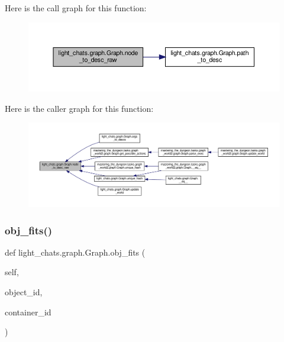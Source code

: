 Here is the call graph for this function\+:
\nopagebreak
\begin{figure}[H]
\begin{center}
\leavevmode
\includegraphics[width=350pt]{classlight__chats_1_1graph_1_1Graph_ae0b96f3393dd176f10c3f154649cdf25_cgraph}
\end{center}
\end{figure}
Here is the caller graph for this function\+:
\nopagebreak
\begin{figure}[H]
\begin{center}
\leavevmode
\includegraphics[width=350pt]{classlight__chats_1_1graph_1_1Graph_ae0b96f3393dd176f10c3f154649cdf25_icgraph}
\end{center}
\end{figure}
\mbox{\label{classlight__chats_1_1graph_1_1Graph_af7460b9c8069563289b8b6b11f831b63}} 
\subsubsection{\texorpdfstring{obj\+\_\+fits()}{obj\_fits()}}
{\footnotesize\ttfamily def light\+\_\+chats.\+graph.\+Graph.\+obj\+\_\+fits (\begin{DoxyParamCaption}\item[{}]{self,  }\item[{}]{object\+\_\+id,  }\item[{}]{container\+\_\+id }\end{DoxyParamCaption})}

